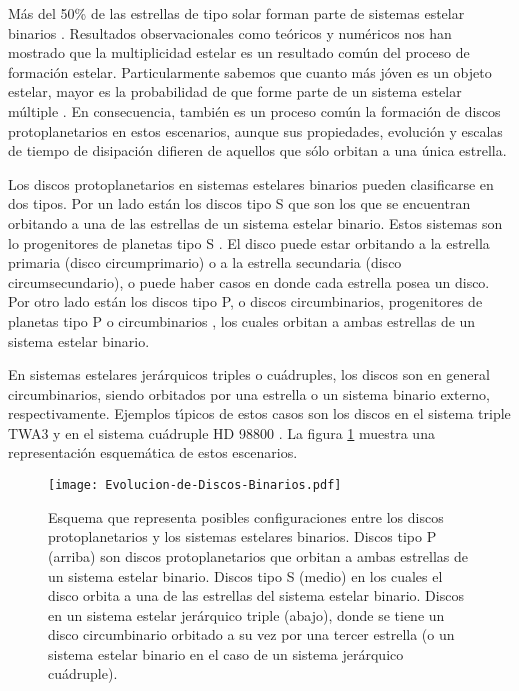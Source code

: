 \documentclass[baaa]{baaa}
\begin{document}
M\'as del 50\% de las estrellas de tipo solar forman parte de sistemas estelar binarios \citep{Raghavan2010}. Resultados observacionales \citep{Duchene2013} como te\'oricos y num\'ericos \citep{Bate2018} nos han mostrado que la multiplicidad estelar es un resultado com\'un del proceso de formaci\'on estelar. Particularmente sabemos que cuanto m\'as j\'oven es un objeto estelar, mayor es la probabilidad de que forme parte de un sistema estelar m\'ultiple \citep{Reipurth2014}. En consecuencia, tambi\'en es un proceso com\'un la formaci\'on de discos protoplanetarios en estos escenarios, aunque sus propiedades, evoluci\'on y escalas de tiempo de disipaci\'on difieren de aquellos que s\'olo orbitan a una \'unica estrella.

Los discos protoplanetarios en sistemas estelares binarios pueden clasificarse en dos tipos. Por un lado est\'an los discos tipo S que son los que se encuentran orbitando a una de las estrellas de un sistema estelar binario. Estos sistemas son lo progenitores de planetas tipo S \citep{Dvorak1982}. El disco puede estar orbitando a la estrella primaria (disco circumprimario) o a la estrella secundaria (disco circumsecundario), o puede haber casos en donde cada estrella posea un disco. Por otro lado est\'an los discos tipo P, o discos circumbinarios, progenitores de planetas tipo P o circumbinarios \citep{Dvorak1984}, los cuales orbitan a ambas estrellas de un sistema estelar binario. 

En sistemas estelares jer\'arquicos triples o cu\'adruples, los discos son en general circumbinarios, siendo orbitados por una estrella o un sistema binario externo, respectivamente. Ejemplos t\'{\i}picos de estos casos son los discos en el sistema triple TWA3 \citep{Czekala2021} y en el sistema cu\'adruple HD 98800 \citep{Soderblom1996, Ribas2018,Kennedy2019,Zuniga2021}. La figura \ref{Multiples} muestra una representaci\'on esquem\'atica de estos escenarios.

\begin{figure}[!t]
\centering
\texttt{[image: Evolucion-de-Discos-Binarios.pdf]}
\caption{Esquema que representa posibles configuraciones entre los discos protoplanetarios y los sistemas estelares binarios. Discos tipo P (arriba) son discos protoplanetarios que orbitan a ambas estrellas de un sistema estelar binario. Discos tipo S (medio) en los cuales el disco orbita a una de las estrellas del sistema estelar binario. Discos en un sistema estelar jer\'arquico triple (abajo), donde se tiene un disco circumbinario orbitado a su vez por una tercer estrella (o un sistema estelar binario en el caso de un sistema jer\'arquico cu\'adruple). }
\label{Multiples}
\end{figure}
\end{document}
